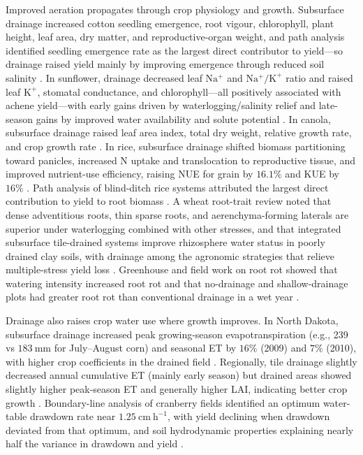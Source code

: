 Improved aeration propagates through crop physiology and growth. Subsurface drainage increased cotton seedling emergence, root vigour, chlorophyll, plant height, leaf area, dry matter, and reproductive-organ weight, and path analysis identified seedling emergence rate as the largest direct contributor to yield—so drainage raised yield mainly by improving emergence through reduced soil salinity \parencite{Yang2022}. In sunflower, drainage decreased leaf \(\mathrm{Na^{+}}\) and \(\mathrm{Na^{+}/K^{+}}\) ratio and raised leaf \(\mathrm{K^{+}}\), stomatal conductance, and chlorophyll—all positively associated with achene yield—with early gains driven by waterlogging/salinity relief and late-season gains by improved water availability and solute potential \parencite{Islam2022}. In canola, subsurface drainage raised leaf area index, total dry weight, relative growth rate, and crop growth rate \parencite{Asgari2021}. In rice, subsurface drainage shifted biomass partitioning toward panicles, increased N uptake and translocation to reproductive tissue, and improved nutrient-use efficiency, raising NUE for grain by \(16.1\%\) and KUE by \(16\%\) \parencite{DarziNaftchali2022b}. Path analysis of blind-ditch rice systems attributed the largest direct contribution to yield to root biomass \parencite{Qi2025b}. A wheat root-trait review noted that dense adventitious roots, thin sparse roots, and aerenchyma-forming laterals are superior under waterlogging combined with other stresses, and that integrated subsurface tile-drained systems improve rhizosphere water status in poorly drained clay soils, with drainage among the agronomic strategies that relieve multiple-stress yield loss \parencite{Chen2025b}. Greenhouse and field work on root rot showed that watering intensity increased root rot and that no-drainage and shallow-drainage plots had greater root rot than conventional drainage in a wet year \parencite{Han2017}.

Drainage also raises crop water use where growth improves. In North Dakota, subsurface drainage increased peak growing-season evapotranspiration (e.g., 239 vs \(183\ \mathrm{mm}\) for July--August corn) and seasonal ET by \(16\%\) (2009) and \(7\%\) (2010), with higher crop coefficients in the drained field \parencite{Rijal2012}. Regionally, tile drainage slightly decreased annual cumulative ET (mainly early season) but drained areas showed slightly higher peak-season ET and generally higher LAI, indicating better crop growth \parencite{Yang2017,Yang2022}. Boundary-line analysis of cranberry fields identified an optimum water-table drawdown rate near \(1.25\ \mathrm{cm\ h^{-1}}\), with yield declining when drawdown deviated from that optimum, and soil hydrodynamic properties explaining nearly half the variance in drawdown and yield \parencite{Bulot2017}.


